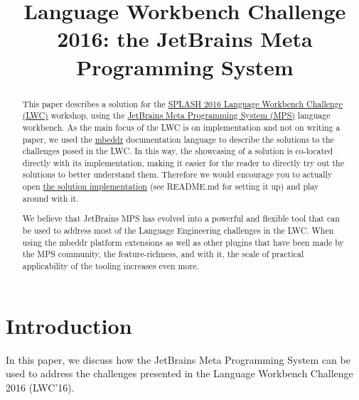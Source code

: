 \documentclass[preprint,numbers,10pt]{sigplanconf}
\begin{document}
\title{Language Workbench Challenge 2016: the JetBrains Meta Programming System}

\maketitle

\begin{abstract}
    This paper describes a solution for the \href{http://2016.splashcon.org/track/lwc2016}{SPLASH 2016 Language Workbench Challenge (LWC)} workshop, using the \href{https://www.jetbrains.com/mps/}{JetBrains Meta Programming System (MPS)} language workbench.
	As the main focus of the LWC is on implementation and not on writing a paper, we used the \href{http://mbeddr.com/}{mbeddr} documentation language to describe the solutions to the challenges posed in the LWC. In this way, the showcasing of a solution is co-located directly with its implementation, making it easier for the reader to directly try out the solutions to better understand them. Therefore we would encourage you to actually open \href{https://github.com/mps-lwc-16/mps-lwc-16}{the solution implementation} (see README.md for setting it up) and play around with it.
	
	We believe that JetBrains MPS has evolved into a powerful and flexible tool that can be used to address most of the Language Engineering challenges in the LWC. When using the mbeddr platform extensions as well as other plugins that have been made by the MPS community, the feature-richness, and with it, the scale of practical applicability of the tooling increases even more.
\end{abstract}
%
%

\section{Introduction}



In this paper, we discuss how the JetBrains Meta Programming System can be used to address the challenges presented in the Language Workbench
Challenge 2016 (LWC'16).
\end{document}
